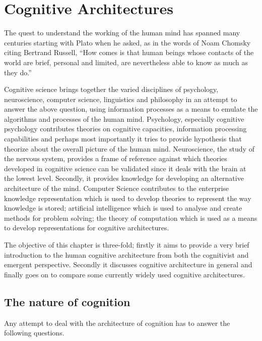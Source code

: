 \chapter{Cognitive Architectures}
\label{chap-two}
The quest to understand the working of the human mind has spanned
many centuries starting with Plato when he asked, as in the words of
Noam Chomsky citing Bertrand Russell, ``How comes is that human beings
whose contacts of the world are brief, personal and limited, are
nevertheless able to know as much as they do.'' \cite{Bogdan:1993aa}

Cognitive science brings together the varied disciplines of
psychology, neuroscience, computer science, linguistics and philosophy in an
attempt to answer the above question, using information processes as a
means to emulate the algorithms and processes of the human
mind. Psychology, especially cognitive psychology contributes theories
on cognitive capacities, information processing capabilities and
perhaps most importantly it tries to provide hypothesis that theorize
about the overall picture of the human mind. Neuroscience, the study
of the nervous system,  provides a frame of reference against which
theories developed in cognitive science can be validated since it
deals with the brain at the lowest level. Secondly, it provides  knowledge
for developing an alternative architecture of the mind. Computer
Science contributes to the enterprise knowledge representation which is
used to develop theories to represent the way knowledge is stored;
artificial intelligence which is used to analyse and create methods
for problem solving; the theory of computation which is used as a
means to develop representations for cognitive
architectures.

The objective of this chapter is three-fold; firstly it aims
to provide a very brief introduction to the human cognitive
architecture from both the cognitivist and
emergent\cite{DBLP:journals/tec/VernonMS07} perspective. Secondly
it discusses cognitive architecture in general and finally goes on
to compare some currently widely used cognitive architectures.

\section{The nature of cognition}
\label{mindArch}

Any attempt to deal with the architecture of cognition has to answer
the following questions.

